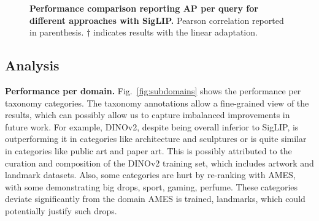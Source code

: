 \begin{figure*}[t]
\vspace{-10pt}
\hspace{-15pt}
  \centering
  \scalebox{0.91}{
    
  }
  \vspace{-16pt}
  \caption{\textbf{Performance comparison per category.} mAP@1k  averaged over objects in the same mid-level taxonomy category,   organized by their primary-level category size, with sorting within each group by SigLIP$^\dagger$+AMES performance. Comparison between SigLIP with and without adaptation, SigLIP combined with AMES reranking, SigLIP t2i, and DINOv2. $\dagger$ indicates results with the linear adaptation.
  \label{fig:subdomains}
  \vspace{-16pt}
  }
\end{figure*}

\begin{figure}[t]
  \centering
  \vspace{-3pt}
  \scalebox{0.88}{
    
  }
  \vspace{-14pt}
  \caption{\textbf{Performance comparison reporting AP per query for different approaches with SigLIP.} Pearson correlation reported in parenthesis. $\dagger$ indicates results with the linear adaptation.}
  \label{fig:pairwise}
  \vspace{-16pt}
\end{figure}

\subsection{Analysis}
\label{sec:analysis}

\noindent\textbf{Performance per domain.} Fig.~\ref{fig:subdomains} shows the performance per taxonomy categories. The taxonomy annotations allow a fine-grained view of the results, which can possibly allow us to capture imbalanced improvements in future work.
For example, DINOv2, despite being overall inferior to SigLIP, is outperforming it in categories like architecture and sculptures or is quite similar in categories like public art and paper art.
This is possibly attributed to the curation and composition of the DINOv2 training set, which includes artwork and landmark datasets. Also, some categories are hurt by re-ranking with AMES, with some demonstrating big drops, \ie sport, gaming, perfume. These categories deviate significantly from the domain AMES is trained, \ie landmarks, which could potentially justify such drops.


